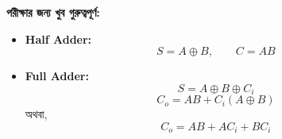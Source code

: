 \par\begingroup

\textbf{পরীক্ষার জন্য খুব গুরুত্বপূর্ণ:}
\begin{itemize}[label={{\bulletfont\textbullet}}, leftmargin=*, nosep]
    \item \textbf{Half Adder:}
    \[
    S=A\oplus B,\qquad C=AB
    \]

    \item \textbf{Full Adder:}
    \[
    S=A\oplus B\oplus C_i
    \]
    \[
    C_o=AB+C_i(A\oplus B)
    \]
    অথবা,
    \[
    C_o=AB+AC_i+BC_i
    \]
\end{itemize}
\par\endgroup
